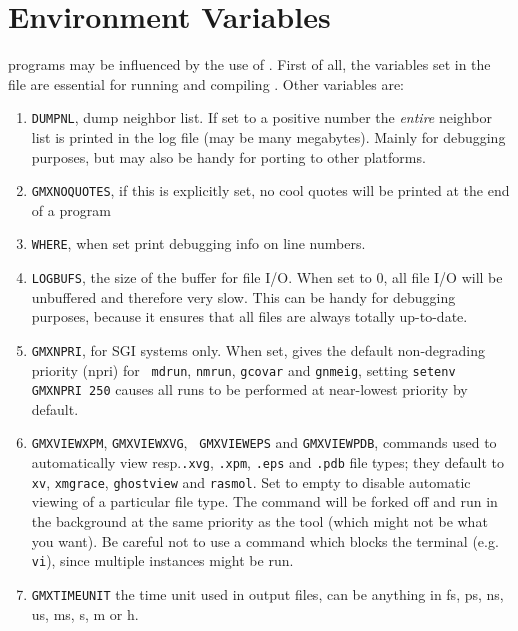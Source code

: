 \section{Environment Variables}
{\gromacs} programs may be influenced by the use of 
. 
First of all, the variables set in the  file
are essential for running and compiling {\gromacs}. Other variables are:
\begin{enumerate}
\item   {\tt DUMPNL}, dump neighbor list. 
        If set to a positive number the {\em entire}
        neighbor list is printed in the log file (may be many megabytes).
        Mainly for debugging purposes, but may also be handy for
        porting to other platforms.
\item   {\tt GMX\us{}NO\us{}QUOTES}, if this is explicitly set, no cool quotes
        will be printed at the end of a program
\item   {\tt WHERE}, when set print debugging info on line numbers.
\item   {\tt LOG\us{}BUFS}, the size of the buffer for file I/O. When set
        to 0, all file I/O will be unbuffered and therefore very slow.
        This can be handy for debugging purposes, because it ensures
        that all files are always totally up-to-date.
\item   {\tt GMXNPRI}, for SGI systems only. When set, gives the
        default non-degrading priority (npri) for {\tt
        mdrun}, {\tt nmrun}, {\tt g\us{}covar} and {\tt g\us{}nmeig},
        {\eg}\@ setting \verb'setenv GMXNPRI 250' causes all
        runs to be performed at near-lowest priority by default.
\item   {\tt GMX\us{}VIEW\us{}XPM}, {\tt GMX\us{}VIEW\us{}XVG}, {\tt
        GMX\us{}VIEW\us{}EPS} and {\tt GMX\us{}VIEW\us{}PDB}, commands used to
        automatically view resp.\@ {\tt .xvg}, {\tt .xpm}, {\tt .eps}
        and {\tt .pdb} file types; they default to {\tt xv}, {\tt xmgrace},
        {\tt ghostview} and {\tt rasmol}. Set to empty to disable
        automatic viewing of a particular file type. The command will
        be forked off and run in the background at the same priority
        as the {\gromacs} tool (which might not be what you want).
        Be careful not to use a command which blocks the terminal
        (e.g. {\tt vi}), since multiple instances might be run.
\item   {\tt GMXTIMEUNIT} the time unit used in output files, can be
        anything in fs, ps, ns, us, ms, s, m or h.
\end{enumerate}

